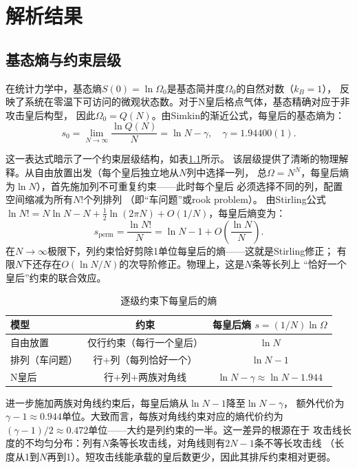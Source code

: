 \chapter{解析结果}

\section{基态熵与约束层级}

在统计力学中，基态熵$S(0)=\ln\Omega_{0}$是基态简并度$\Omega_{0}$的自然对数（$k_{B}=1$），
反映了系统在零温下可访问的微观状态数。对于N皇后格点气体，基态精确对应于非攻击皇后构型，
因此$\Omega_{0}=Q(N)$。由Simkin的渐近公式，每皇后的基态熵为：
%
\begin{equation}
  s_{0} = \lim_{N\to\infty}\frac{\ln Q(N)}{N}
        = \ln N - \gamma,\quad \gamma = 1.94400(1).
  \label{eq:s0}
\end{equation}

这一表达式暗示了一个约束层级结构，如表\ref{tab:entropy}所示。
该层级提供了清晰的物理解释。从自由放置出发（每个皇后独立地从$N$列中选择一列，
总$\Omega=N^{N}$，每皇后熵为$\ln N$），首先施加列不可重复约束——此时每个皇后
必须选择不同的列，配置空间缩减为所有$N!$个列排列
（即``车问题''或rook problem\cite{Knuth2022}）。
由Stirling公式$\ln N!=N\ln N-N+\frac{1}{2}\ln(2\pi N)+O(1/N)$，每皇后熵变为：
%
\begin{equation}
  s_{\text{perm}} = \frac{\ln N!}{N}
  = \ln N - 1 + O\!\left(\frac{\ln N}{N}\right).
  \label{eq:sperm}
\end{equation}
%
在$N\to\infty$极限下，列约束恰好剪除1单位每皇后的熵——这就是Stirling修正；
有限$N$下还存在$O(\ln N/N)$的次导阶修正。物理上，这是$N$条等长列上
``恰好一个皇后''约束的联合效应。

\begin{table}[htbp]
  \centering
  \caption{逐级约束下每皇后的熵}
  \label{tab:entropy}
  \begin{tabular}{lcc}
    \toprule
    模型 & 约束 & 每皇后熵 $s=(1/N)\ln\Omega$ \\
    \midrule
    自由放置 & 仅行约束（每行一个皇后） & $\ln N$ \\
    排列（车问题） & 行$+$列（每列恰好一个） & $\ln N-1$ \\
    N皇后 & 行$+$列$+$两族对角线 & $\ln N-\gamma\approx\ln N-1.944$ \\
    \bottomrule
  \end{tabular}
\end{table}

进一步施加两族对角线约束后，每皇后熵从$\ln N-1$降至$\ln N-\gamma$，
额外代价为$\gamma-1\approx0.944$单位。大致而言，每族对角线约束对应的熵代价约为
$(\gamma-1)/2\approx0.472$单位——大约是列约束的一半。这一差异的根源在于
攻击线长度的不均匀分布：列有$N$条等长攻击线，对角线则有$2N-1$条不等长攻击线
（长度从1到$N$再到1）。短攻击线能承载的皇后数更少，因此其排斥约束相对更弱。

